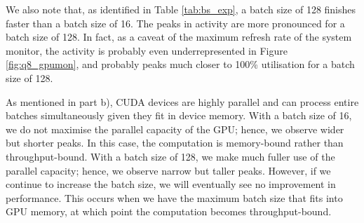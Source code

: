 \begin{enumerate}[label=\alph*)]
    We also note that, as identified in Table \ref{tab:bs_exp}, a batch size of 128 finishes faster than a batch size of 16. The peaks in activity are more pronounced for a batch size of 128. In fact, as a caveat of the maximum refresh rate of the system monitor, the activity is probably even underrepresented in Figure \ref{fig:q8_gpumon}, and probably peaks much closer to 100\% utilisation for a batch size of 128.

    As mentioned in part b), CUDA devices are highly parallel and can process entire batches simultaneously given they fit in device memory. With a batch size of 16, we do not maximise the parallel capacity of the GPU; hence, we observe wider but shorter peaks. In this case, the computation is memory-bound rather than throughput-bound. With a batch size of 128, we make much fuller use of the parallel capacity; hence, we observe narrow but taller peaks. However, if we continue to increase the batch size, we will eventually see no improvement in performance. This occurs when we have the maximum batch size that fits into GPU memory, at which point the computation becomes throughput-bound.

\end{enumerate}
